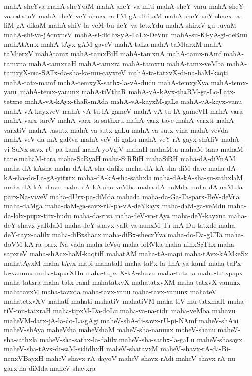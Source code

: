 {mahA-sheYva
mahA-sheYvaM
mahA-sheY-va-miti
mahA-sheY-varu
mahA-sheY-va-satxtoV
mahA-sheY-veY-shacx-ra-liM-gA-dhikaM
mahA-sheY-veY-shacx-ra-liM-gA-dikaM
mahA-shiV-la-veM-bu-deY-va-tetxYdu
mahA-shirxV-gu-ruvaM
mahA-shi-va-jAcnxneV
mahA-si-didhx-yA-LaLx-DeVnu
mahA-su-Ki-yA-gi-deRnu
mahAtAmx
mahA-tAyx-gAM-gaveV
mahA-taLa
mahA-taMtarxM
mahA-taMterxV
mahAtamx
mahA-tamxBiH
mahA-tamxnA
mahA-tamx-nAmf
mahA-tamxna
mahA-tamxnaH
mahA-tamxra
mahA-tamxru
mahA-tamx-veMba
mahA-tamxyX-ma-SATx-da-sha-ka-mu-cayxteV
mahA-ta-tatxvX-di-na-haM-kaqti
mahA-tatx-mamf
mahA-temxyX-sathx-la-vA-dudu
mahA-temxyXya
mahA-temx-yanu
mahA-temx-yanunx
mahA-tiVthaR
mahA-vA-kAyx-thaRM-ga-Lo-Latx-tetxne
mahA-vA-kAyx-thaR-mAda
mahA-vA-kayxM-gaLe
mahA-vA-kayx-vanu
mahA-vA-kayxveV
mahA-vA-tu-lA-gameV
mahA-vA-tu-lA-gameVH
mahA-vara
mahA-varx-tareV
mahA-varx-ta-sathxru
mahA-varx-tave
mahA-varxti
mahA-varxtiV
mahA-vasutx
mahA-va-sutx-gaLu
mahA-va-sutx-vina
mahA-veVda
mahA-veV-da-mA-gaRva
mahA-veV-di-gaLu
mahA-veY-rA-gayx-shAliV
mahA-vi-SuNx-savx-rU-pa-kamf
mahA-yoVgiV
mahaH
mahaMta
mahaM-tana
mahaM-tane
mahaM-tara
maha-SaRyaH
maha-SiRBiH
mahaSiRH
maha-dA-diVnAM
maha-dA-kAsha
maha-dA-kA-sha-dalilx
maha-dA-kA-sha-diM-dave
maha-dA-kA-sha-do-La-gA-yitutx
maha-dA-kA-sha-sathxla
maha-dA-kA-sha-su-sathxlaM
maha-dA-kA-shave
maha-dA-kA-sha-veMba
maha-dA-naMda
maha-dA-naM-da-parx-Na-vaveV
maha-dUrx-pa-diMda
mahada
maha-da-Ga-Ta-parx-BeV-deVna
maha-daMga
maha-daM-ga-savx-rU-pa-vA-deYkayx
maha-daM-ga-veMdu
maha-da-lolx-pupx-titx-hudu
maha-da-riva
maha-deV-va-rAya
maha-deY-kayxna
maha-deY-shavx-yaRdaM
maha-deY-shavx-yaR-va-nunxM-Tu-mA-Du-tatxde
maha-deY-tayx-nalilx
maha-diBxshacx
maha-diBx-shecxYva
maha-do-Da-gUTa
maha-doVM-kA-ra-parx-Na-vada
maha-leVsu
maha-loRVka
maha-ninxSeThx
maha-sapxteV
maha-shAcx-haM-kaqtiH
mahatAM
maha-tA-mapi
maha-tAvx-kAMkeSx
mahatAyxM
maha-tAyx-mapi
mahataH
maha-taPx-la-dhA-ya-kamf
maha-taPx-la-vanunx
maha-tapxrXBu
maha-tapxrX-kA-shavu
maha-tatxna
maha-tatxpapx
maha-tatxra
maha-tatx-ramf
mahatatxvX
mahatatxvXM
maha-tatxvX-vanunx
mahatavxM
maha-tavxda
maha-tavx-vanu
maha-tavx-vanunx
mahateV
mahatetxvXV
mahatf
mahati
mahatiV
mahatiVM
maha-tiV-mu-tatxmaH
maha-tiV-mu-tatxraH
maha-tipxM-Da-doLu
maha-va-na-ridu
maha-veMba
mahavu
maheVM-darx-jA-la-do-La-gAgi
maheV-shA-di-savx-rU-pi-NAmf
maheV-shAni
maheV-shAya
maheVsha
maheVshaM
maheV-sha-nanunx
maheV-shanu
maheV-sha-sathxla
maheV-sha-sathx-la-dalilx
maheV-sha-sathx-la-gaLu
maheV-shasayx
maheV-sha-tAvx-di-saM-sididhxH
maheV-shatavxM
maheV-shavx-rA-da-Bi-nenxVBayxH
maheV-shavx-rA-dayoV
maheV-shavx-rAdi
maheV-shavx-rA-nu-garx-ha-diMda
maheV-shavxra
}

